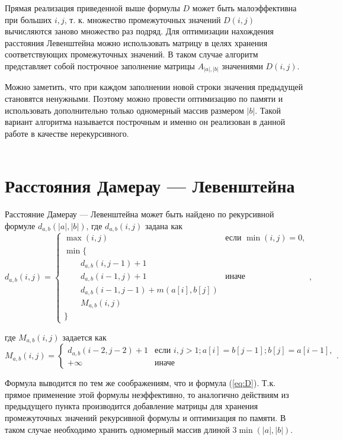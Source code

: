 Прямая реализация приведенной выше формулы $D$ может быть малоэффективна при больших $i, j$, т. к. множество промежуточных значений $D(i, j)$ вычисляются заново множество раз подряд. Для оптимизации нахождения расстояния Левенштейна можно использовать матрицу в целях хранения соответствующих промежуточных значений. В таком случае алгоритм представляет собой построчное заполнение матрицы 
$A_{|a|,|b|}$ значениями $D(i, j)$.

Можно заметить, что при каждом заполнении новой строки значения
предыдущей становятся ненужными. Поэтому можно провести оптимизацию по памяти и использовать дополнительно только одномерный массив размером $|b|$. Такой вариант алгоритма называется построчным и именно он реализован в данной работе в качестве нерекурсивного.\\ \\

\section{Расстояния Дамерау — Левенштейна}

Расстояние Дамерау — Левенштейна может быть найдено по рекурсивной формуле $d_{a,b}(|a|, |b|)$, где $d_{a,b}(i, j)$ задана как
\begin{equation}
	d_{a,b}(i, j) = \begin{cases}
		\max(i, j) &\text{если }\min(i, j) = 0,\\
		\min \lbrace \\
			\qquad d_{a,b}(i, j-1) + 1\\
			\qquad d_{a,b}(i-1, j) + 1 &\text{иначе}\\
			\qquad d_{a,b}(i-1, j-1) + m(a[i], b[j])\\
			\qquad M_{a,b}(i, j)\\
		\rbrace
		\end{cases},
\end{equation}

где $M_{a,b}(i, j)$ задается как
\begin{equation}
	M_{a,b}(i, j) = \begin{cases}
		d_{a,b}(i-2, j-2) + 1 &\text{если }i,j > 1; a[i] = b[j-1]; b[j] = a[i-1],\\
		+\infty &\text{иначе}
	\end{cases}.
\end{equation}

Формула выводится по тем же соображениям, что и формула (\ref{eq:D}).
Т.к. прямое применение этой формулы неэффективно, то аналогично действиям из предыдущего пункта производится добавление матрицы для хранения промежуточных значений рекурсивной формулы и оптимизация по памяти. В таком случае необходимо хранить одномерный массив длиной $3\min(|a|,|b|)$.

